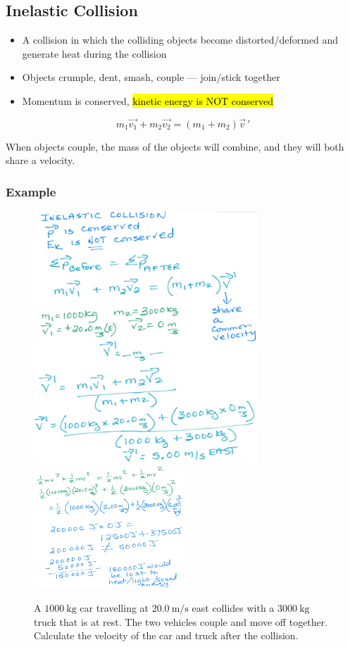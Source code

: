 \documentclass[a4paper,12pt]{article}
\begin{document}
\subsection{Inelastic Collision}
\begin{itemize}
    \item{A collision in which the colliding objects become distorted/deformed and generate heat during the collision}
    \item{Objects crumple, dent, smash, couple --- join/stick together}
    \item{Momentum is conserved, \hl{kinetic energy is NOT conserved}}
\end{itemize}

\Large $$m_1\vec{v_1} + m_2\vec{v_2} = (m_1+m_2)\vec{v}\,'$$ \normalsize

When objects couple, the mass of the objects will combine, and they will both share a velocity.

\subsubsection{Example}
\begin{figure}[H]
    \centering
    \caption{A $\SI{1000}{\kg}$ car travelling at $\SI{20.0}{\m/\s}$ east collides with a $\SI{3000}{\kg}$ truck that is at rest. The two vehicles couple and move off together. Calculate the velocity of the car and truck after the collision.}
    \includegraphics[width=0.75\textwidth]{q-inelastic-1}
    \includegraphics[width=0.5\textwidth]{q-inelastic-1b}
\end{figure}
\end{document}
